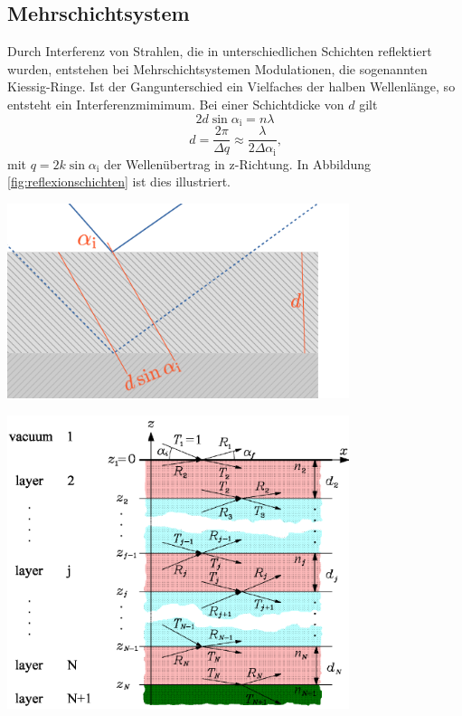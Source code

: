 \documentclass[captions=tableheading]{scrartcl}
\newcommand{\indx}[1]{\text{#1}}
\begin{document}
\subsection{Mehrschichtsystem}
Durch Interferenz von Strahlen, die in unterschiedlichen Schichten reflektiert wurden, entstehen bei Mehrschichtsystemen Modulationen, die sogenannten Kiessig-Ringe.
Ist der Gangunterschied ein Vielfaches der halben Wellenlänge, so entsteht ein Interferenzmimimum. 
Bei einer Schichtdicke von $d$ gilt
\begin{equation}
2d\sin \alpha_{\indx{i}} =n\lambda
\end{equation}
\begin{equation}
d=\frac{2\pi}{\Delta q}\approx \frac{\lambda}{2\Delta\alpha_{\indx{i}}}\text{,}
\label{eq:schichtdicke}
\end{equation}
mit $q=2k\sin \alpha_{\indx{i}}$ der Wellenübertrag in z-Richtung. In Abbildung \ref{fig:reflexionschichten} ist dies illustriert.
\begin{center}
	\includegraphics[width=10cm]{images/reflexionschichten.png}
	\label{fig:reflexionschichten}
\end{center}
\begin{center}
	\includegraphics[width=10cm]{images/reflexionmehrschichten.png}
	\label{fig:reflexionmehrschichten}
\end{center}
\end{document}
